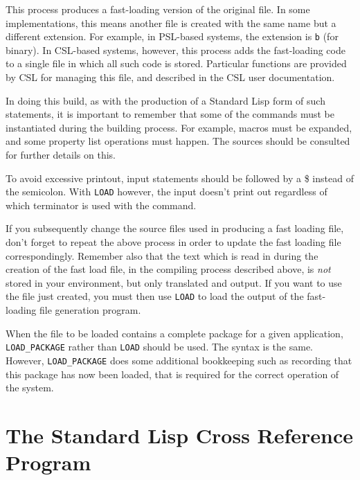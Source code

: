 This process produces a fast-loading version of the original file.  In some
implementations, this means another file is created with the same name but
a different extension. For example, in PSL-based systems, the extension is
{\tt b} (for binary). In CSL-based systems, however, this process adds the
fast-loading code to a single file in which all such code is stored. 
Particular functions are provided by CSL for managing this file, and 
described in the CSL user documentation.

In doing this build, as with the production of a Standard Lisp form of
such statements, it is important to remember that some of the commands
must be instantiated during the building process.  For example, macros
must be expanded, and some property list operations must happen.
The {\REDUCE} sources should be consulted for further details on this.

To avoid excessive printout, input statements should be followed by a \$
instead of the semicolon.  With {\tt LOAD} however, the input doesn't
print out regardless of which terminator is used with the command.

If you subsequently change the source files used in producing a fast
loading file, don't forget to repeat the above process in order to update
the fast loading file correspondingly.  Remember also that the text which
is read in during the creation of the fast load file, in the compiling
process described above, is {\em not\/} stored in your {\REDUCE}
environment, but only translated and output.  If you want to use the file
just created, you must then use {\tt LOAD} to load the output of the
fast-loading file generation program.

When the file to be loaded contains a complete package for a given
application, {\tt LOAD\_PACKAGE} rather than
{\tt LOAD} should be used.  The syntax is the same.  However,
{\tt LOAD\_PACKAGE} does some additional bookkeeping such as recording that
this package has now been loaded, that is required for the correct
operation of the system.

\section{The Standard Lisp Cross Reference Program}

